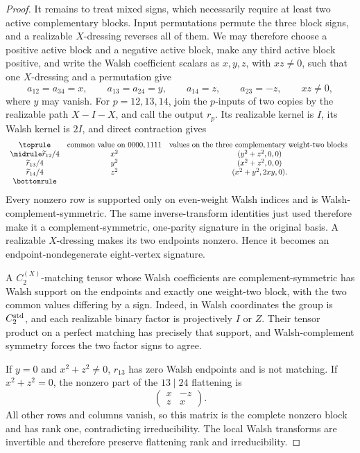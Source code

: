 \documentclass[11pt,letterpaper,onecolumn]{article}
\theoremstyle{plain}
\theoremstyle{definition}
\theoremstyle{remark}
\newcommand{\CycX}[1]{{C_{#1}^{(X)}}}
\begin{document}
\begin{proof}
It remains to treat mixed signs, which necessarily require at least two
active complementary blocks.  Input permutations permute the three block signs, and a realizable \(X\)-dressing reverses all of them.  We may therefore choose a
positive active block and a negative active block, make any third active
block positive, and write the Walsh coefficient scalars as \(x,y,z\), with
\(xz\ne0\), such that one \(X\)-dressing and a permutation give
\begin{equation*}
 a_{12}=a_{34}=x,\qquad
 a_{13}=a_{24}=y,\qquad
 a_{14}=z,\qquad a_{23}=-z,
 \qquad xz\ne0,
\end{equation*}
where \(y\) may vanish.  For \(p=12,13,14\), join the \(p\)-inputs of two
copies by the realizable path \(X-I-X\), and call the output \(r_p\).  Its
realizable kernel is \(I\), its Walsh kernel is \(2I\), and direct contraction
gives
\begin{equation*}
\begin{array}{ccc}
\toprule
 &\text{common value on }0000,1111
 &\text{values on the three complementary weight-two blocks}\ \\ \midrule
 \widetilde r_{12}/4&x^2&(y^2+z^2,0,0)\\
 \widetilde r_{13}/4&y^2&(x^2+z^2,0,0)\\
 \widetilde r_{14}/4&z^2&(x^2+y^2,2xy,0).\\
\bottomrule
\end{array}
\end{equation*}
Every nonzero row is supported only on even-weight Walsh indices and is
Walsh-complement-symmetric.  The same inverse-transform identities just used
therefore make it a complement-symmetric, one-parity signature in the original basis. A realizable \(X\)-dressing makes its two endpoints nonzero.  Hence it becomes an
endpoint-nondegenerate eight-vertex signature.

A \(\CycX{2}\)-matching tensor whose Walsh coefficients are
complement-symmetric has Walsh support on the endpoints and exactly one
weight-two block, with the two common values differing by a sign.  Indeed,
in Walsh coordinates the group is \(C_2^{\rm std}\), and each realizable binary factor
is projectively \(I\) or \(Z\). Their tensor product on a
perfect matching has precisely that support, and Walsh-complement symmetry
forces the two factor signs to agree.

If \(y=0\) and \(x^2+z^2\ne0\), \(r_{13}\) has zero Walsh endpoints and
is not matching.  If \(x^2+z^2=0\), the nonzero part of the
\(13\mid24\) flattening is
\[
 \begin{pmatrix}x&-z\\ z&x\end{pmatrix}.
\]
All other rows and columns vanish, so this matrix is the complete nonzero
block and has rank one, contradicting irreducibility.  The local Walsh
transforms are invertible and therefore preserve flattening rank and irreducibility.


\end{proof}
\end{document}
